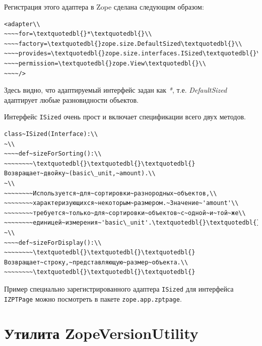 \documentclass[a4paper,openany,twoside,draft]{book}
\providecommand*{\DUroletitlereference}[1]{\textsl{#1}}
\begin{document}
Регистрация этого адаптера в Zope сделана следующим образом:

\begin{verbatim}
<adapter\\
~~~~for=\textquotedbl{}*\textquotedbl{}\\
~~~~factory=\textquotedbl{}zope.size.DefaultSized\textquotedbl{}\\
~~~~provides=\textquotedbl{}zope.size.interfaces.ISized\textquotedbl{}\\
~~~~permission=\textquotedbl{}zope.View\textquotedbl{}\\
~~~~/>
\end{verbatim}

Здесь видно, что адаптируемый интерфейс задан как \DUroletitlereference{*},
т.е. \DUroletitlereference{DefaultSized} адаптирует любые разновидности объектов.

Интерфейс \texttt{ISized} очень прост и включает спецификации всего двух
методов.

\begin{verbatim}
class~ISized(Interface):\\
~\\
~~~~def~sizeForSorting():\\
~~~~~~~~\textquotedbl{}\textquotedbl{}\textquotedbl{}Возвращает~двойку~(basic\_unit,~amount).\\
~\\
~~~~~~~~Используется~для~сортировки~разнородных~объектов,\\
~~~~~~~~характеризующихся~некоторым~размером.~Значение~'amount'\\
~~~~~~~~требуется~только~для~сортировки~объектов~с~одной~и~той~же\\
~~~~~~~~единицей~измерения~'basic\_unit'.\textquotedbl{}\textquotedbl{}\textquotedbl{}\\
~\\
~~~~def~sizeForDisplay():\\
~~~~~~~~\textquotedbl{}\textquotedbl{}\textquotedbl{}Возвращает~строку,~представляющую~размер~объекта.\\
~~~~~~~~\textquotedbl{}\textquotedbl{}\textquotedbl{}
\end{verbatim}

Пример специально зарегистрированного адаптера \texttt{ISized} для
интерфейса \texttt{IZPTPage} можно посмотреть в пакете \texttt{zope.app.zptpage}.


\section{Утилита ZopeVersionUtility%
  \label{zopeversionutility}%
}
\end{document}
